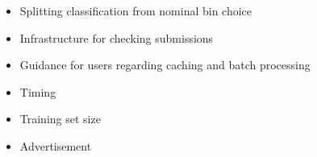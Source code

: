 \documentclass[twocolumn,twocolappendix]{aastex63}
\begin{document}
\begin{itemize}
    \item Splitting classification from nominal bin choice
    \item Infrastructure for checking submissions
    \item Guidance for users regarding caching and batch processing
    \item Timing
    \item Training set size
    \item Advertisement
\end{itemize}

\end{document}
